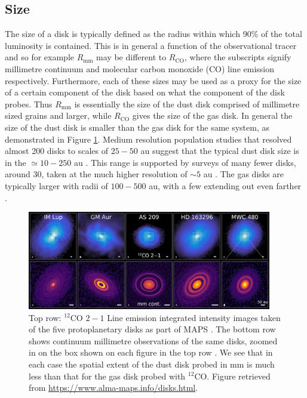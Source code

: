 \subsection{Size}

The size of a disk is typically defined as the radius within which 90\% of the total luminosity is contained.
This is in general a function of the observational tracer and so for example $R_\mathrm{mm}$ may be different to $R_\mathrm{CO}$, where the subscripts signify millimetre continuum and molecular carbon monoxide (CO) line emission respectively. 
Furthermore, each of these sizes may be used as a proxy for the size of a certain component of the disk based on what the component of the disk probes.
Thus $R_\mathrm{mm}$ is essentially the size of the dust disk comprised of millimetre sized grains and larger, while $R_\mathrm{CO}$ gives the size of the gas disk.
In general the size of the dust disk is smaller than the gas disk for the same system, as demonstrated in Figure \ref{fig:maps_disks}.
Medium resolution population studies that resolved almost 200 disks to scales of $25-50$ au suggest that the typical dust disk size is in the $\simeq 10 - 250$ au \citep{tripathi2017,andrews2018a,hendler2020}.
This range is supported by surveys of many fewer disks, around 30, taken at the much higher resolution of $\sim5$ au \citep{long2018,huang2018b}.
The gas disks are typically larger with radii of $100 - 500$ au, with a few extending out even farther \citep{ansdell2018,zhang2021}.

\begin{figure}
    \centering
    \includegraphics[width = 0.95\textwidth]{figures/Figure-DISKS-Website.png}
    \caption{Top row: $^{12}$CO $2-1$ Line emission integrated intensity images taken of the five protoplanetary disks as part of MAPS \citep{oberg2021}.
    The bottom row shows continuum millimetre observations of the same disks, zoomed in on the box shown on each figure in the top row \citep{andrews2018,huang2020,oberg2021}. 
    We see that in each case the spatial extent of the dust disk probed in mm is much less than that for the gas disk probed with $^{12}$CO.
    Figure retrieved from \url{https://www.alma-maps.info/disks.html}.}
    \label{fig:maps_disks}
\end{figure}

